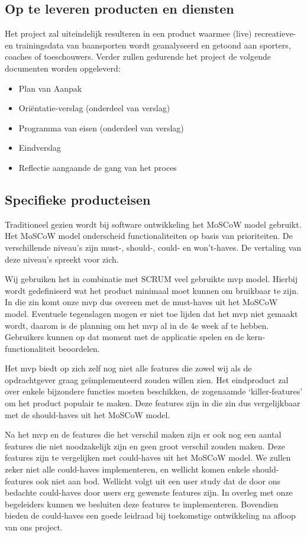 

\subsection{Op te leveren producten en diensten}
Het project zal uiteindelijk resulteren in een product waarmee (live) recreatieve- en trainingsdata van baansporten wordt geanalyseerd en getoond aan sporters, coaches of toeschouwers. Verder zullen gedurende het project de volgende documenten worden opgeleverd: \begin{itemize}
\item Plan van Aanpak
\item Oriëntatie-verslag (onderdeel van verslag)
\item Programma van eisen (onderdeel van verslag)
\item Eindverslag
\item Reflectie aangaande de gang van het proces
\end{itemize}

\subsection{Specifieke producteisen}
Traditioneel gezien wordt bij software ontwikkeling het MoSCoW model gebruikt. Het MoSCoW model onderscheid functionaliteiten op basis van prioriteiten. De verschillende niveau's zijn must-, should-, could- en won't-haves. De vertaling van deze niveau's spreekt voor zich.

Wij gebruiken het in combinatie met SCRUM veel gebruikte \acf{mvp} model. Hierbij wordt gedefinieerd wat het product minimaal moet kunnen om bruikbaar te zijn. In die zin komt onze \ac{mvp} dus overeen met de must-haves uit het MoSCoW model. Eventuele tegenslagen mogen er niet toe lijden dat het \ac{mvp} niet gemaakt wordt, daarom is de planning om het \ac{mvp} al in de 4e week af te hebben. Gebruikers kunnen op dat moment met de applicatie spelen en de kern-functionaliteit beoordelen.

Het \ac{mvp} biedt op zich zelf nog niet alle features die zowel wij als de opdrachtgever graag geïmplementeerd zouden willen zien. Het eindproduct zal over enkele bijzondere functies moeten beschikken, de zogenaamde `killer-features' om het product populair te maken. Deze features zijn in die zin dus vergelijkbaar met de should-haves uit het MoSCoW model.

Na het \ac{mvp} en de features die het verschil maken zijn er ook nog een aantal features die niet noodzakelijk zijn en geen groot verschil zouden maken. Deze features zijn te vergelijken met could-haves uit het MoSCoW model. We zullen zeker niet alle could-haves implementeren, en wellicht komen enkele should-features ook niet aan bod. Wellicht volgt uit een user study dat de door ons bedachte could-haves door users erg gewenste features zijn. In overleg met onze begeleiders kunnen we besluiten deze features te implementeren. Bovendien bieden de could-haves een goede leidraad bij toekomstige ontwikkeling na afloop van ons project.

